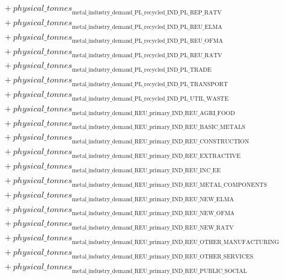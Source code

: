 \documentclass[11pt]{article}
\begin{document}
\begin{align*}
&\quad {}+ {physical\_tonnes}_{\text{metal\_industry\_demand\_PL\_recycled\_IND\_PL\_REP\_RATV}}\\
&\quad {}+ {physical\_tonnes}_{\text{metal\_industry\_demand\_PL\_recycled\_IND\_PL\_REU\_ELMA}}\\
&\quad {}+ {physical\_tonnes}_{\text{metal\_industry\_demand\_PL\_recycled\_IND\_PL\_REU\_OFMA}}\\
&\quad {}+ {physical\_tonnes}_{\text{metal\_industry\_demand\_PL\_recycled\_IND\_PL\_REU\_RATV}}\\
&\quad {}+ {physical\_tonnes}_{\text{metal\_industry\_demand\_PL\_recycled\_IND\_PL\_TRADE}}\\
&\quad {}+ {physical\_tonnes}_{\text{metal\_industry\_demand\_PL\_recycled\_IND\_PL\_TRANSPORT}}\\
&\quad {}+ {physical\_tonnes}_{\text{metal\_industry\_demand\_PL\_recycled\_IND\_PL\_UTIL\_WASTE}}\\
&\quad {}+ {physical\_tonnes}_{\text{metal\_industry\_demand\_REU\_primary\_IND\_REU\_AGRI\_FOOD}}\\
&\quad {}+ {physical\_tonnes}_{\text{metal\_industry\_demand\_REU\_primary\_IND\_REU\_BASIC\_METALS}}\\
&\quad {}+ {physical\_tonnes}_{\text{metal\_industry\_demand\_REU\_primary\_IND\_REU\_CONSTRUCTION}}\\
&\quad {}+ {physical\_tonnes}_{\text{metal\_industry\_demand\_REU\_primary\_IND\_REU\_EXTRACTIVE}}\\
&\quad {}+ {physical\_tonnes}_{\text{metal\_industry\_demand\_REU\_primary\_IND\_REU\_INC\_EE}}\\
&\quad {}+ {physical\_tonnes}_{\text{metal\_industry\_demand\_REU\_primary\_IND\_REU\_METAL\_COMPONENTS}}\\
&\quad {}+ {physical\_tonnes}_{\text{metal\_industry\_demand\_REU\_primary\_IND\_REU\_NEW\_ELMA}}\\
&\quad {}+ {physical\_tonnes}_{\text{metal\_industry\_demand\_REU\_primary\_IND\_REU\_NEW\_OFMA}}\\
&\quad {}+ {physical\_tonnes}_{\text{metal\_industry\_demand\_REU\_primary\_IND\_REU\_NEW\_RATV}}\\
&\quad {}+ {physical\_tonnes}_{\text{metal\_industry\_demand\_REU\_primary\_IND\_REU\_OTHER\_MANUFACTURING}}\\
&\quad {}+ {physical\_tonnes}_{\text{metal\_industry\_demand\_REU\_primary\_IND\_REU\_OTHER\_SERVICES}}\\
&\quad {}+ {physical\_tonnes}_{\text{metal\_industry\_demand\_REU\_primary\_IND\_REU\_PUBLIC\_SOCIAL}}\\

\end{align*}
\end{document}
